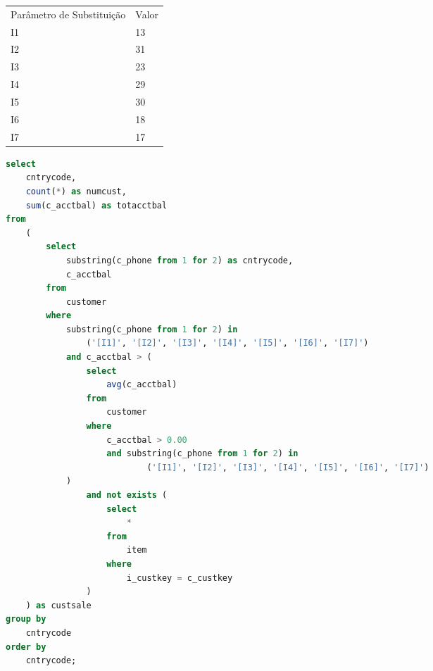 \begin{enumerate}
\begin{tabular}{ll}
	Parâmetro de Substituição & Valor\\
	I1 & 13 \\
	I2 & 31 \\
	I3 & 23 \\
	I4 & 29 \\
	I5 & 30 \\
	I6 & 18 \\
	I7 & 17 \\
\end{tabular}

	\begin{lstlisting}[language=SQL]
select
    cntrycode,
    count(*) as numcust,
    sum(c_acctbal) as totacctbal
from
    (
        select
            substring(c_phone from 1 for 2) as cntrycode,
            c_acctbal
        from
            customer
        where
            substring(c_phone from 1 for 2) in
                ('[I1]', '[I2]', '[I3]', '[I4]', '[I5]', '[I6]', '[I7]')
            and c_acctbal > (
                select
                    avg(c_acctbal)
                from
                    customer
                where
                    c_acctbal > 0.00
                    and substring(c_phone from 1 for 2) in
                            ('[I1]', '[I2]', '[I3]', '[I4]', '[I5]', '[I6]', '[I7]')
            )
                and not exists (
                    select
                        *
                    from
                        item
                    where
                        i_custkey = c_custkey
                )
    ) as custsale
group by
    cntrycode
order by
    cntrycode;
	\end{lstlisting}

\end{enumerate}